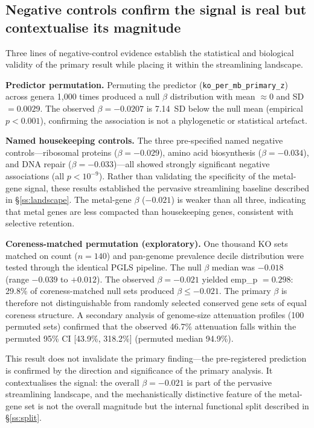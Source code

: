 \documentclass[times]{zHenriquesLab-StyleBioRxiv}
\begin{document}



\subsection{Negative controls confirm the signal is real but contextualise
its magnitude}
\label{ss:negctrl}

Three lines of negative-control evidence establish the statistical and
biological validity of the primary result while placing it within the
streamlining landscape.

\textbf{Predictor permutation.} Permuting the predictor
(\texttt{ko\_per\_mb\_primary\_z}) across genera 1,000 times produced a null
$\beta$ distribution with mean $\approx 0$ and SD $= 0.0029$. The observed
$\beta = -0.0207$ is 7.14~SD below the null mean (empirical $p < 0.001$),
confirming the association is not a phylogenetic or statistical artefact.

\textbf{Named housekeeping controls.} The three pre-specified named negative
controls---ribosomal proteins ($\beta = -0.029$), amino acid biosynthesis
($\beta = -0.034$), and DNA repair ($\beta = -0.033$)---all showed strongly
significant negative associations (all $p < 10^{-9}$). Rather than validating
the specificity of the metal-gene signal, these results established the
pervasive streamlining baseline described in \S\ref{ss:landscape}. The metal-gene
$\beta$ ($-0.021$) is weaker than all three, indicating that metal genes are
less compacted than housekeeping genes, consistent with selective retention.

\textbf{Coreness-matched permutation (exploratory).} One thousand KO
sets matched on count ($n = 140$) and pan-genome prevalence decile distribution
were tested through the identical PGLS pipeline. The null $\beta$ median was
$-0.018$ (range $-0.039$ to $+0.012$). The observed $\beta = -0.021$ yielded
emp\_p $= 0.298$: 29.8\% of coreness-matched null sets produced $\beta \leq
-0.021$. The primary $\beta$ is therefore not distinguishable from randomly
selected conserved gene sets of equal coreness structure. A secondary analysis
of genome-size attenuation profiles (100 permuted sets) confirmed that the
observed 46.7\% attenuation falls within the permuted 95\% CI [43.9\%, 318.2\%]
(permuted median 94.9\%).

This result does not invalidate the primary finding---the pre-registered prediction
is confirmed by the direction and significance of the primary analysis. It contextualises the
signal: the overall $\beta = -0.021$ is part of the pervasive streamlining
landscape, and the mechanistically distinctive feature of the metal-gene set is
not the overall magnitude but the internal functional split described in
\S\ref{ss:split}.
\end{document}
